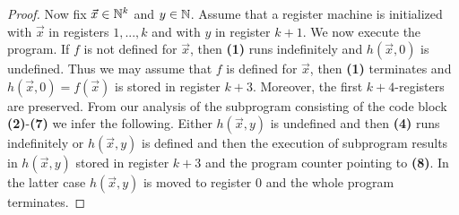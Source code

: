 \documentclass[10pt]{amsart}
\begin{document}
\begin{proof}
	Now fix $\vec{x} \in {\mathbb N}^k$ and $y\in {\mathbb N}$. Assume that a register machine is initialized with $\vec{x}$ in registers $1,...,k$ and with $y$ in register $k + 1$. We now execute the program. If $f$ is not defined for $\vec{x}$, then \textbf{(1)} runs indefinitely and $h(\vec{x},0)$ is undefined. Thus we may assume that $f$ is defined for $\vec{x}$, then \textbf{(1)} terminates and $h(\vec{x},0) = f(\vec{x})$ is stored in register $k + 3$. Moreover, the first $k + 4$-registers are preserved. From our analysis of the subprogram consisting of the code block \textbf{(2)}-\textbf{(7)} we infer the following. Either $h(\vec{x},y)$ is undefined and then \textbf{(4)} runs indefinitely or $h(\vec{x},y)$ is defined and then the execution of subprogram results in $h(\vec{x},y)$ stored in register $k + 3$ and the program counter pointing to \textbf{(8)}. In the latter case $h(\vec{x},y)$ is moved to register $0$ and the whole program terminates.
\end{proof}
\end{document}
